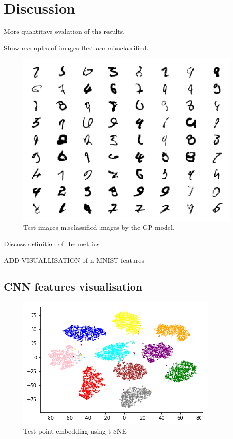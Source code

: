 \documentclass{article}
\begin{document}
\section{Discussion}
More quantitave evalution of the results.

Show examples of images that are missclassified.
\begin{figure}[h]
	\centering
	\includegraphics[scale=0.6]{incorrect_mnist}
	\caption{Test images misclassified images by the GP model.}
\end{figure}


Discuss definition of the metrics.

ADD VISUALLISATION of n-MNIST features
\subsection{CNN features visualisation}
\begin{figure}[h]
	\centering
	\includegraphics[scale=0.5]{embeddings_visualisation.png}
	\caption{Test point embedding using t-SNE}
\end{figure}

\small



\end{document}
